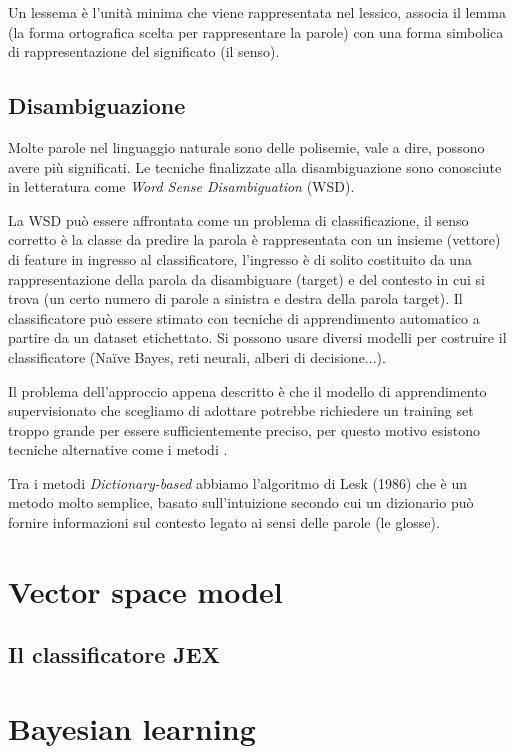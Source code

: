 \documentclass{article}
\theoremstyle{plain}
\theoremstyle{definition}
\begin{document}
Un lessema è l'unità minima che viene rappresentata nel lessico, associa
il lemma (la forma ortografica scelta per rappresentare la parole) con una forma simbolica di rappresentazione del significato (il senso).

\subsection{Disambiguazione}
Molte parole nel linguaggio naturale sono delle polisemie, vale a dire, possono avere più significati. Le tecniche finalizzate alla disambiguazione sono conosciute in letteratura come \textit{Word Sense Disambiguation} (WSD).

La WSD può essere affrontata come un problema di classificazione, il senso
corretto è la classe da predire la parola è rappresentata con un insieme (vettore) di feature in ingresso al classificatore, l'ingresso è di solito costituito da una rappresentazione della parola da disambiguare (target) e del 
contesto in cui si trova (un certo numero di parole a sinistra e destra della
parola target). Il classificatore può essere stimato con tecniche di apprendimento automatico a partire da un dataset etichettato. Si possono usare diversi modelli per costruire il classificatore (Naïve Bayes, reti neurali, alberi di decisione...).

Il problema dell'approccio appena descritto è che il modello di apprendimento supervisionato che scegliamo di adottare potrebbe richiedere un training set troppo grande per essere sufficientemente preciso, per questo motivo esistono tecniche alternative come i metodi .

Tra i metodi \textit{Dictionary-based} abbiamo l'algoritmo di Lesk (1986) che è un metodo molto semplice, basato sull'intuizione secondo cui un dizionario può
fornire informazioni sul contesto legato ai sensi delle parole (le glosse).  



\newpage
\section{Vector space model}
\subsection{Il classificatore JEX}

\newpage
\section{Bayesian learning}
\end{document}
